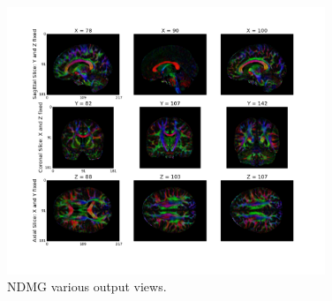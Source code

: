\documentclass[simplex.tex]{subfiles}
\begin{document}
\begin{figure}[h!]
\begin{cframed}
\centering
\includegraphics[width=0.85\textwidth]{../../figs/ndmg.png}
\caption{
NDMG various output views.  
}
\label{fig:ndmg}
\end{cframed}
\end{figure}
\end{document}
